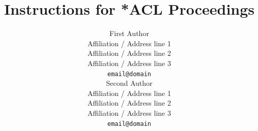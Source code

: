 \usepackage{inconsolata}

\usepackage{graphicx}

%
%

\title{Instructions for *ACL Proceedings}


\author{First Author \\
  Affiliation / Address line 1 \\
  Affiliation / Address line 2 \\
  Affiliation / Address line 3 \\
  \texttt{email@domain} \\\And
  Second Author \\
  Affiliation / Address line 1 \\
  Affiliation / Address line 2 \\
  Affiliation / Address line 3 \\
  \texttt{email@domain} \\}

